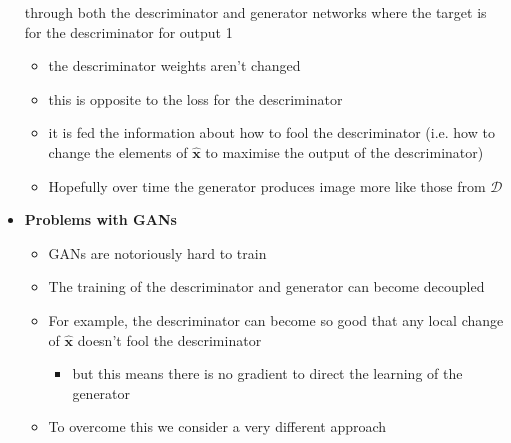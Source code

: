\documentclass[11pt]{article}
\begin{document}
\begin{itemize}
through both the descriminator and generator networks where the
target is for the descriminator for output 1
\begin{itemize}
\item the descriminator weights aren't changed
\item this is opposite to the loss for the descriminator
\item it is fed the information about how to fool the descriminator
(i.e. how to change the elements of \(\hat{\bm{x}}\) to maximise
the output of the descriminator)
\item Hopefully over time the generator produces image more like
those from \(\mathcal{D}\)
\end{itemize}
\item \textbf{Problems with GANs}
\begin{itemize}
\item GANs are notoriously hard to train
\item The training of the descriminator and generator can become decoupled
\item For example, the descriminator can become so good that any
local change of \(\hat{\bm{x}}\) doesn't fool the descriminator
\begin{itemize}
\item but this means there is no gradient to direct the learning of
the generator
\end{itemize}
\item To overcome this we consider a very different approach
\end{itemize}
\end{itemize}
\end{document}
